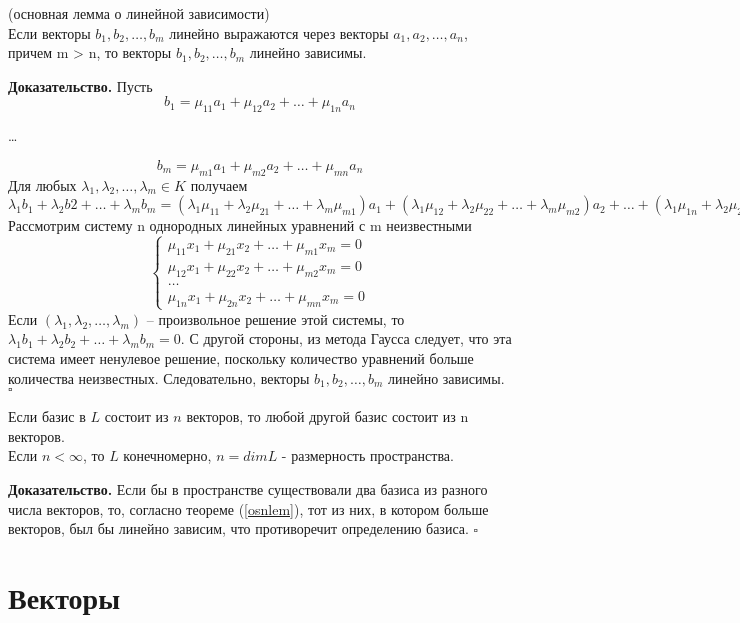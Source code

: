 \begin{theor}\label{osnlem}
(основная лемма о линейной зависимости)\\
Если векторы $b_1, b_2, …, b_m$ линейно выражаются через векторы
$a_1,a_2, …, a_n$, причем m > n, то векторы $b_1, b_2, …, b_m$ линейно зависимы.
\end{theor}
\textbf{Доказательство.} Пусть
$$b_1 = \mu_{11}a_1 + \mu_{12}a_2 +…+\mu_{1n}a_n$$
\begin{center}
    \ldots
\end{center}
$$b_m =\mu_{m1}a_1 +\mu_{m2}a_2 +…+\mu_{mn}a_n$$
Для любых $\lambda_1, \lambda_2, …, \lambda_m \in K$ получаем
$\lambda_1b_1 +\lambda_2b2 +…+\lambda_mb_m =(\lambda_1\mu_{11}
+\lambda_2\mu_{21} +…+\lambda_m\mu_{m1})a_1
+(\lambda_1\mu_{12} +\lambda_2\mu_{22} +…+\lambda_m\mu_{m2})a_2 +
\ldots +(\lambda_1\mu_{1n} +\lambda_2\mu_{2n} +…+\lambda_m\mu_{mn})a_n$
Рассмотрим систему n однородных линейных уравнений с m неизвестными
$$\begin{cases}
\mu_{11}x_1 + \mu_{21}x_2 +…+ \mu_{m1}x_m =0\\
\mu_{12}x_1 + \mu_{22}x_2 +…+ \mu_{m2}x_m =0\\
\ldots\\
\mu_{1n}x_1 +\mu_{2n}x_2 +…+\mu_{mn}x_m =0 \end{cases}$$
Если $(\lambda_1, \lambda_2, …, \lambda_m)$ – произвольное решение этой
системы, то $\lambda_1b_1 +\lambda_2b_2 +…+\lambda_mb_m =0$.
С другой стороны, из метода Гаусса следует, что эта система имеет ненулевое
решение, поскольку количество уравнений больше количества неизвестных.
Следовательно, векторы $b_1, b_2, …, b_m$ линейно зависимы. $\square$


\begin{theor}
Если базис в $L$ состоит из $n$ векторов, то любой другой базис состоит из
n векторов.\\ 
Если $n<\infty$, то $L$ конечномерно,  $n=dim L$ - размерность пространства.  
\end{theor}
\textbf{Доказательство.} Если бы в пространстве существовали два
базиса из разного числа векторов, то, согласно теореме (\ref{osnlem}),
тот из них, в котором больше векторов, был бы линейно зависим, что противоречит
определению базиса. $\square$


\section{Векторы}
